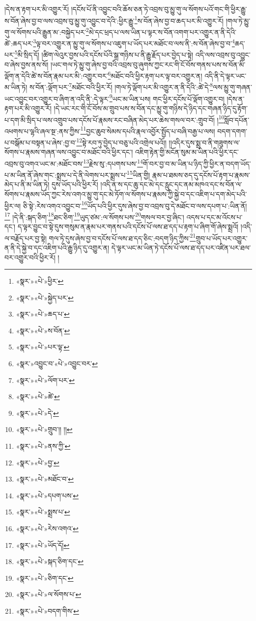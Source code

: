 །དེས་ན་རྟག་པར་མི་འགྱུར་རོ། །དངོས་པོ་ནི་འབྱུང་བའི་ཆོས་ཅན་ཏེ་འབྲས་བུ་མྱུ་གུ་ལ་སོགས་པའོ་གང་གི་ཕྱིར་རྒྱུ་ས་བོན་ཞེས་བྱ་བ་ལས་འབྲས་བུ་མྱུ་གུ་འབྱུང་བ་དེའི་:ཕྱིར་རྒྱུ་\footnote{«སྣར་»«པེ་»ཕྱིར་}ས་བོན་ཞེས་བྱ་བ་ཆད་པར་མི་འགྱུར་རོ། །གལ་ཏེ་མྱུ་གུ་ལ་སོགས་པའི་རྒྱུན་མ་:བསྐྱེད་པར་\footnote{«སྣར་»«པེ་»སྐྱེད་པར་}མེ་དང་ཕྲད་པ་ལས་ཡིན་པ་ལྟར་ས་བོན་འགག་པར་འགྱུར་ན་ནི་དེའི་ཚེ་:ཆད་པར་\footnote{«སྣར་»«པེ་»ཆད་པ་}ལྟ་བར་འགྱུར་ན་མྱུ་གུ་ལ་སོགས་པ་འཇུག་པ་ཡོད་པར་མཐོང་བ་ལས་ནི་:ས་བོན་ཞེས་བྱ་བ་\footnote{«སྣར་»«པེ་»ས་བོན་}ཆད་པར་\footnote{«སྣར་»«པེ་»པར་ལྟ་}མི་སྲིད་དོ། །ཚིག་ལེའུར་བྱས་པའི་དངོས་པོའི་སྒྲ་གཉིས་པ་ནི་རྒྱུ་རྗོད་པར་བྱེད་པ་སྟེ། འདི་ལས་འབྲས་བུ་འབྱུང་བ་ཞེས་བྱས་ནས་སོ། །ཡང་གལ་ཏེ་མྱུ་གུ་ཞེས་བྱ་བའི་འབྲས་བུ་ཞུགས་ཀྱང་རང་གི་ངོ་བོས་གནས་པས་ས་བོན་མི་ལྡོག་ན་དེའི་ཚེ་ས་བོན་རྣམ་པར་མི་:འགྱུར་བར་\footnote{«སྣར་»འབྱུང་བ་«པེ་»འབྱུང་བར་}མཐོང་བའི་ཕྱིར་རྟག་པར་ལྟ་བར་འགྱུར་ན། འདི་ནི་དེ་ལྟར་ཡང་མ་ཡིན་ཏེ། ས་བོན་:ལྡོག་པར་\footnote{«སྣར་»«པེ་»ལོག་པར་}མཐོང་བའི་ཕྱིར་རོ། །གལ་ཏེ་ལྡོག་པར་མི་འགྱུར་ན་ནི་དེའི་:ཚེ་དེ་\footnote{«སྣར་»«པེ་»ཚེ་}ལས་མྱུ་གུ་གཞན་ཡང་འབྱུང་བར་འགྱུར་བ་ཞིག་ན་འདི་ནི་:དེ་ལྟར་\footnote{«སྣར་»«པེ་»དེ་}ཡང་མ་ཡིན་པས། གང་ཕྱིར་དངོས་པོ་ལྡོག་འགྱུར་བ། །དེས་ན་རྟག་པར་མི་འགྱུར་རོ། །དེ་ཡང་རང་གི་ངོ་བོས་མ་གྲུབ་པས་ས་བོན་དང་མྱུ་གུ་གཉིས་དེ་ཉིད་དང་གཞན་ཉིད་དུ་རྟོག་པ་དག་མི་སྲིད་པ་ལས་འགྲུབ་པས་དངོས་པོ་རྣམས་རང་བཞིན་མེད་པར་ཆེས་གསལ་བར་:གྲུབ་བོ། །\footnote{«སྣར་»«པེ་»གྲུབ་།། །།}སློབ་དཔོན་འཕགས་པ་ལྷའི་ཞལ་སྔ་:ནས་ཀྱིས་\footnote{«སྣར་»«པེ་»ནས་ཀྱི་}བྱང་ཆུབ་སེམས་དཔའི་རྣལ་འབྱོར་སྤྱོད་པ་བཞི་བརྒྱ་པ་ལས། བདག་དགག་པ་བསྒོམ་པ་བསྟན་པ་ཞེས་:བྱ་བ་\footnote{«སྣར་»«པེ་»བྱ་}སྟེ་རབ་ཏུ་བྱེད་པ་བཅུ་པའི་འགྲེལ་པའོ།། །།འདིར་དུས་སྨྲ་བ་ནི་གཟུགས་ལ་སོགས་པ་རྣམས་གཞན་ལས་འབྱུང་བ་མཐོང་བའི་ཕྱིར་དང་། འཇིག་རྟེན་གྱི་མངོན་སུམ་མ་ཡིན་པའི་ཕྱིར་དང་འབྲས་བུ་འགའ་ཡང་མ་:མཐོང་བས་\footnote{«སྣར་»«པེ་»མཐོང་བ་}རྗེས་སུ་:དཔགས་པས་\footnote{«སྣར་»«པེ་»དཔག་པས་}གོ་བར་བྱ་བ་མ་ཡིན་པ་ཉིད་ཀྱི་ཕྱིར་ན་བདག་ཡོད་པ་མ་ཡིན་ནོ་ཞེས་གང་:སྨྲས་པ་དེ་ནི་ལེགས་པར་སྨྲས་པ་\footnote{«སྣར་»«པེ་»སྨྲས་པ་}ཡིན་གྱི། རྣམ་པ་ཐམས་ཅད་དུ་དངོས་པོ་རྟག་པ་རྣམས་མེད་པ་ནི་མ་ཡིན་ཏེ། དུས་ཡོད་པའི་ཕྱིར་རོ། །འདི་ན་ས་དང་ཆུ་དང་མེ་དང་རླུང་དང་ནམ་མཁའ་དང་ས་བོན་ལ་སོགས་པ་རྣམས་ཡོད་ཀྱང་རེས་འགའ་མྱུ་གུ་དང་མེ་ཏོག་ལ་སོགས་པ་རྣམས་ཀྱི་སྐྱེ་བ་དང་འཇིག་པ་དག་མེད་པའི་ཕྱིར་ལ། ཅི་སྟེ་:རེས་འགའ་འབྱུང་བ་\footnote{«སྣར་»«པེ་»རེས་འགའ་}ཡོད་པའི་ཕྱིར་དུས་ཞེས་བྱ་བ་འབྲས་བུ་དེ་མཐོང་བ་ལས་དཔག་པ་:ཡིན་ནོ།\footnote{«སྣར་»«པེ་»ཡོད་དོ།} །དེ་ནི་:སྐད་ཅིག་\footnote{«སྣར་»«པེ་»སྐད་ཅིག་དང་}ཐང་ཅིག་\footnote{«སྣར་»«པེ་»ཅིག་དང་}ཡུད་ཙམ་:ལ་སོགས་པས་\footnote{«སྣར་»«པེ་»ལ་སོགས་པ་}གསལ་བར་བྱ་ཞིང་། འདས་པ་དང་མ་འོངས་པ་དང་། ད་ལྟར་བྱུང་བ་སྟེ་དུས་གསུམ་ན་རྣམ་པར་གནས་པའི་དངོས་པོ་ལས་ཐ་དད་པ་རྟག་པ་ཞིག་གོ་ཞེས་སྨྲའོ། །འདི་ལ་བརྗོད་པར་བྱ་སྟེ། གལ་ཏེ་དུས་ཞེས་བྱ་བ་དངོས་པོ་ལས་ཐ་དད་ཅིང་:བདག་ཉིད་ཀྱིས་\footnote{«སྣར་»«པེ་»བདག་གིས་}གྲུབ་པ་ཡོད་པར་འགྱུར་ན་ནི་དེ་སྐྱེ་བ་དང་འཇིག་པའི་རྒྱུ་ཉིད་དུ་འགྱུར་ན། དེ་ལྟར་ཡང་མ་ཡིན་ཏེ་དངོས་པོ་ལས་ཐ་དད་པར་འཛིན་པར་ཐལ་བར་འགྱུར་བའི་ཕྱིར་རོ། །
